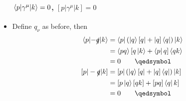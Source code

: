 \documentclass{beamer}
\begin{document}
\begin{frame}
\begin{itemize}
    \framesubtitle<4>{$\mel{p}{\gamma^\mu}{k} = 0$, $[p|\gamma^\mu|k] = 0$}
    \item<only@4> Define $q_\nu$ as before, then
    \begin{align*}
        \mel{p}{-\slashed{q}}{k} &= \bra{p}\left(\ket{q}[q| + |q]\bra{q}\right)\ket{k} \\
        &= \ev{pq}[q\ket{k} + \bra{p}q]\ev{qk} \\
        &= 0 \qquad\qedsymbol \\
        [p|-\slashed{q}|k] &= [p|\left(\ket{q}[q| + |q]\bra{q}\right)|k] \\
        &= [p\ket{q}[qk] + [pq]\bra{q}k] \\
        &= 0 \qquad\qedsymbol
    \end{align*}
\end{itemize}
\end{frame}
\end{document}
